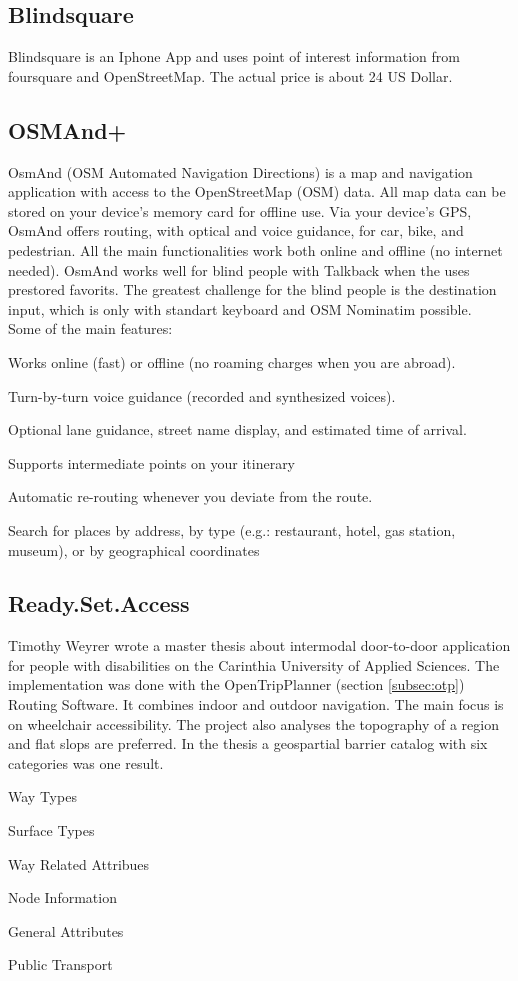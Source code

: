 \documentclass{sig-alternate}
\begin{document}
\subsection{Blindsquare}
Blindsquare\cite{blindsquare} is an Iphone App and uses point of interest information from foursquare and OpenStreetMap. The actual price is about 24 US Dollar. 

\subsection{OSMAnd+}
OsmAnd (OSM Automated Navigation Directions) is a map and navigation application with access to the OpenStreetMap (OSM) data. All map data can be stored on your device's memory card for offline use. Via your device's GPS, OsmAnd offers routing, with optical and voice guidance, for car, bike, and pedestrian. All the main functionalities work both online and offline (no internet needed).
OsmAnd works well for blind people with Talkback when the uses prestored favorits. The greatest challenge for the blind people is the destination input, which is only with standart keyboard and OSM Nominatim possible. \\
Some of the main features: 
\begin{description}
  \item Works online (fast) or offline (no roaming charges when you are abroad). 
  \item Turn-by-turn voice guidance (recorded and synthesized voices). 
  \item Optional lane guidance, street name display, and estimated time of arrival. 
  \item Supports intermediate points on your itinerary
  \item Automatic re-routing whenever you deviate from the route.
  \item Search for places by address, by type (e.g.: restaurant, hotel, gas station, museum), or by geographical coordinates
\end{description}


\subsection{Ready.Set.Access} 
Timothy Weyrer\cite{weyrer} wrote a master thesis about intermodal door-to-door application for people with disabilities on the Carinthia University of Applied Sciences. The implementation was done with the OpenTripPlanner (section \ref{subsec:otp}) Routing Software. It combines indoor and outdoor navigation. The main focus is on wheelchair accessibility. The project also analyses the topography of a region and flat slops are preferred. In the thesis a geospartial barrier catalog with six categories was one result. 
\begin{description}
  \item Way Types
  \item Surface Types 
  \item Way Related Attribues 
  \item Node Information
  \item General Attributes
  \item Public Transport
\end{description}
\end{document}
